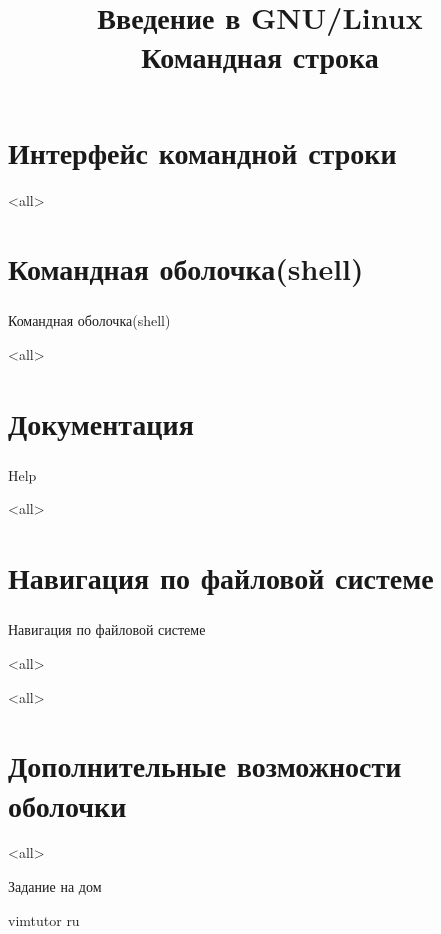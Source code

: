 
\title{Введение в GNU/Linux\\Командная строка}


\begin{frame}
 \frametitle{}
 \titlepage
\end{frame}

\section{Интерфейс командной строки}
\mode<all>{}

\section{ Командная оболочка(shell) }
\begin{frame}
\frametitle{}
 \begin{center}
   {\Large Командная оболочка(shell) }
 \end{center}
\end{frame}

\mode<all>{}

\section{ Документация }
\begin{frame}
\frametitle{}
 \begin{center}
   {\Large Help }
 \end{center}
\end{frame}
\mode<all>{}

\section{ Навигация по файловой системе}
\begin{frame}
\frametitle{}
 \begin{center}
   {\Large Навигация по файловой системе }
 \end{center}
\end{frame}
\mode<all>{}

\mode<all>{}


\section{ Дополнительные возможности оболочки}
\mode<all>{}


\begin{frame}{Задание на дом}
\begin{block}{}
vimtutor ru
\end{block}
\end{frame}



